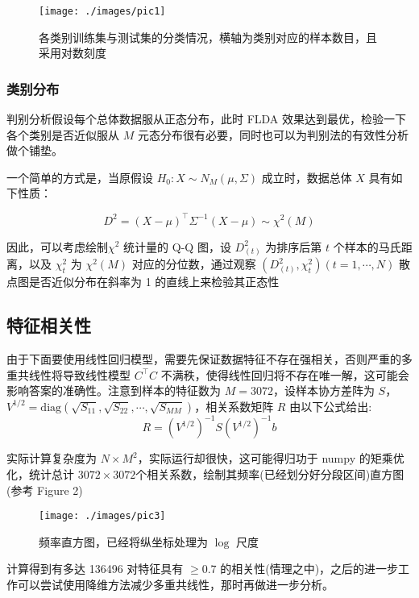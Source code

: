 \documentclass[fleqn]{Paquetes/RevDigMatEduInt}
\begin{document}
\begin{figure}[h]
	\centering
	\texttt{[image: ./images/pic1]}
	\caption{各类别训练集与测试集的分类情况，横轴为类别对应的样本数目，且采用对数刻度}
\end{figure}

\subsubsection{类别分布}

判别分析假设每个总体数据服从正态分布，此时 FLDA 效果达到最优，检验一下各个类别是否近似服从 $M$ 元态分布很有必要，同时也可以为判别法的有效性分析做个铺垫。

一个简单的方式是，当原假设 $H_0:X\sim N_M(\mu,\Sigma)$ 成立时，数据总体 $X$ 具有如下性质：

\begin{lema}
$$
D^2 = (X - \mu)^\top \Sigma^{-1} (X - \mu) \sim \chi^2(M)
$$
\end{lema}

因此，可以考虑绘制$\chi^2$ 统计量的 Q-Q 图，设 $D_{(t)}^2$ 为排序后第 $t$ 个样本的马氏距离，以及 $\chi_t^2$ 为 $\chi^2(M)$ 对应的分位数，通过观察 $(D_{(t)}^2,\chi_t^2)(t = 1,\cdots,N)$ 散点图是否近似分布在斜率为 1 的直线上来检验其正态性


\subsection{特征相关性}

由于下面要使用线性回归模型，需要先保证数据特征不存在强相关，否则严重的多重共线性将导致线性模型 $C^\top C$ 不满秩，使得线性回归将不存在唯一解，这可能会影响答案的准确性。注意到样本的特征数为 $M = 3072$，设样本协方差阵为 $S$，$V^{1/2} = \mathrm{diag}(\sqrt{S_{11}},  \sqrt{S_{22}},\cdots,\sqrt{S_{MM}})$，相关系数矩阵  $R$ 由以下公式给出:
$$
R = (V^{1/2})^{-1}S(V^{1/2})^{-1}b 
$$

实际计算复杂度为 $N \times M^2$，实际运行却很快，这可能得归功于 numpy 的矩乘优化，统计总计 $3072 \times 3072$个相关系数，绘制其频率(已经划分好分段区间)直方图(参考 Figure 2)

\begin{figure}[h]
	\centering
	\texttt{[image: ./images/pic3]}
	\caption{频率直方图，已经将纵坐标处理为 $\log$ 尺度}
\end{figure}

计算得到有多达 136496 对特征具有 $\geq 0.7$ 的相关性(情理之中)，之后的进一步工作可以尝试使用降维方法减少多重共线性，那时再做进一步分析。
\end{document}
